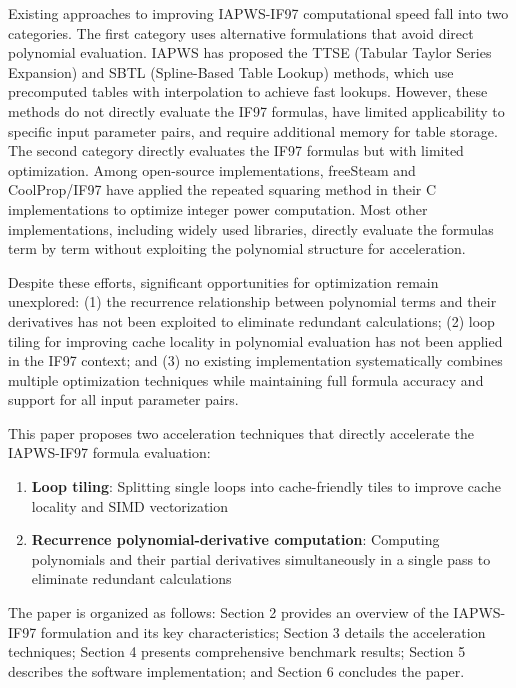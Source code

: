 \documentclass{article}
\begin{document}
Existing approaches to improving IAPWS-IF97 computational speed fall into two categories. The first category uses alternative formulations that avoid direct polynomial evaluation. IAPWS has proposed the TTSE (Tabular Taylor Series Expansion) \cite{TTSE} and SBTL (Spline-Based Table Lookup) \cite{SBTL} methods, which use precomputed tables with interpolation to achieve fast lookups. However, these methods do not directly evaluate the IF97 formulas, have limited applicability to specific input parameter pairs, and require additional memory for table storage. The second category directly evaluates the IF97 formulas but with limited optimization. Among open-source implementations, freeSteam \cite{FreeSteam} and CoolProp/IF97 \cite{CoolPropIF97} have applied the repeated squaring method in their C implementations to optimize integer power computation. Most other implementations, including widely used libraries, directly evaluate the formulas term by term without exploiting the polynomial structure for acceleration.

Despite these efforts, significant opportunities for optimization remain unexplored: (1) the recurrence relationship between polynomial terms and their derivatives has not been exploited to eliminate redundant calculations; (2) loop tiling for improving cache locality in polynomial evaluation has not been applied in the IF97 context; and (3) no existing implementation systematically combines multiple optimization techniques while maintaining full formula accuracy and support for all input parameter pairs.

This paper proposes two acceleration techniques that directly accelerate the IAPWS-IF97 formula evaluation:
\begin{enumerate}
    \item \textbf{Loop tiling}: Splitting single loops into cache-friendly tiles to improve cache locality and SIMD vectorization
    \item \textbf{Recurrence polynomial-derivative computation}: Computing polynomials and their partial derivatives simultaneously in a single pass to eliminate redundant calculations
\end{enumerate}

The paper is organized as follows: Section 2 provides an overview of the IAPWS-IF97 formulation and its key characteristics; Section 3 details the acceleration techniques; Section 4 presents comprehensive benchmark results; Section 5 describes the software implementation; and Section 6 concludes the paper.
\end{document}
